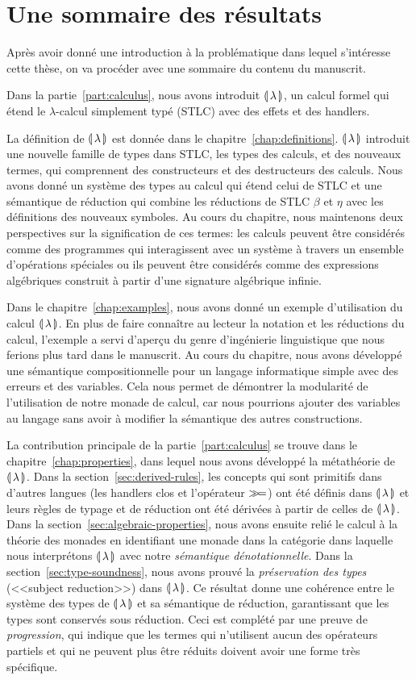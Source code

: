 \section*{Une sommaire des résultats}
\label{sec:french-summary-of-results}

Après avoir donné une introduction à la problématique dans lequel s'intéresse
cette thèse, on va procéder avec une sommaire du contenu du manuscrit.

Dans la partie~\ref{part:calculus}, nous avons introduit ${\llparenthesis \, \lambda \, \rrparenthesis}$, un calcul
formel qui étend le $\lambda$-calcul simplement typé (STLC) avec des effets et
des handlers.

La définition de ${\llparenthesis \, \lambda \, \rrparenthesis}$ est donnée dans le chapitre~\ref{chap:definitions}.
${\llparenthesis \, \lambda \, \rrparenthesis}$ introduit une nouvelle famille de types dans STLC, les types des
calculs, et des nouveaux termes, qui comprennent des constructeurs et des
destructeurs des calculs. Nous avons donné un système des types au calcul qui
étend celui de STLC et une sémantique de réduction qui combine les réductions de
STLC $\beta$ et $\eta$ avec les définitions des nouveaux symboles. Au cours du
chapitre, nous maintenons deux perspectives sur la signification de ces termes:
les calculs peuvent être considérés comme des programmes qui interagissent avec
un système à travers un ensemble d'opérations spéciales ou ils peuvent être
considérés comme des expressions algébriques construit à partir d'une signature
algébrique infinie.

Dans le chapitre~\ref{chap:examples}, nous avons donné un exemple d'utilisation
du calcul ${\llparenthesis \, \lambda \, \rrparenthesis}$. En plus de faire connaître au lecteur la notation et les
réductions du calcul, l'exemple a servi d'aperçu du genre d'ingénierie
linguistique que nous ferions plus tard dans le manuscrit. Au cours du chapitre,
nous avons développé une sémantique compositionnelle pour un langage
informatique simple avec des erreurs et des variables. Cela nous permet de
démontrer la modularité de l'utilisation de notre monade de calcul, car nous
pourrions ajouter des variables au langage sans avoir à modifier la sémantique
des autres constructions.

La contribution principale de la partie~\ref{part:calculus} se trouve dans le
chapitre~\ref{chap:properties}, dans lequel nous avons développé la métathéorie
de ${\llparenthesis \, \lambda \, \rrparenthesis}$. Dans la section~\ref{sec:derived-rules}, les concepts qui sont
primitifs dans d'autres langues (les handlers clos et l'opérateur $\mathbin{\gg\!=}$) ont
été définis dans ${\llparenthesis \, \lambda \, \rrparenthesis}$ et leurs règles de typage et de réduction ont été
dérivées à partir de celles de ${\llparenthesis \, \lambda \, \rrparenthesis}$. Dans la
section~\ref{sec:algebraic-properties}, nous avons ensuite relié le calcul à la
théorie des monades en identifiant une monade dans la catégorie dans laquelle
nous interprétons ${\llparenthesis \, \lambda \, \rrparenthesis}$ avec notre \emph{sémantique dénotationnelle}. Dans la
section~\ref{sec:type-soundness}, nous avons prouvé la \emph{préservation des
  types} (<<subject reduction>>) dans ${\llparenthesis \, \lambda \, \rrparenthesis}$. Ce résultat donne une cohérence
entre le système des types de ${\llparenthesis \, \lambda \, \rrparenthesis}$ et sa sémantique de réduction,
garantissant que les types sont conservés sous réduction. Ceci est complété par
une preuve de \emph{progression}, qui indique que les termes qui n'utilisent
aucun des opérateurs partiels et qui ne peuvent plus être réduits doivent avoir
une forme très spécifique.

